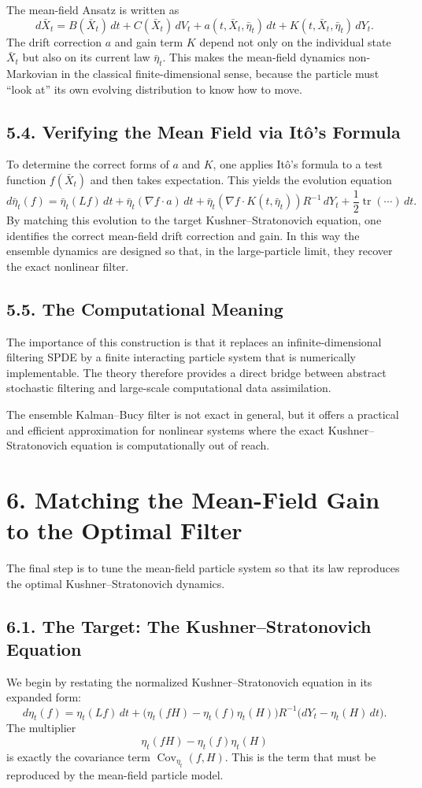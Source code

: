 \documentclass[11pt]{article}
\theoremstyle{definition}
\theoremstyle{remark}
\begin{document}
The mean-field Ansatz is written as
\[
d\bar X_t
=
B(\bar X_t)\,dt
+
C(\bar X_t)\,dV_t
+
a(t,\bar X_t,\bar\eta_t)\,dt
+
K(t,\bar X_t,\bar\eta_t)\,dY_t.
\]
The drift correction \(a\) and gain term \(K\) depend not only on the individual state \(\bar X_t\) but also on its current law \(\bar\eta_t\). This makes the mean-field dynamics non-Markovian in the classical finite-dimensional sense, because the particle must ``look at'' its own evolving distribution to know how to move.

\subsection*{5.4. Verifying the Mean Field via It\^o's Formula}
To determine the correct forms of \(a\) and \(K\), one applies It\^o's formula to a test function \(f(\bar X_t)\) and then takes expectation. This yields the evolution equation
\[
d\bar\eta_t(f)
=
\bar\eta_t(Lf)\,dt
+
\bar\eta_t(\nabla f\cdot a)\,dt
+
\bar\eta_t(\nabla f\cdot K(t,\bar\eta_t))R^{-1}\,dY_t
+
\frac12 \operatorname{tr}(\cdots)\,dt.
\]
By matching this evolution to the target Kushner--Stratonovich equation, one identifies the correct mean-field drift correction and gain. In this way the ensemble dynamics are designed so that, in the large-particle limit, they recover the exact nonlinear filter.

\subsection*{5.5. The Computational Meaning}
The importance of this construction is that it replaces an infinite-dimensional filtering SPDE by a finite interacting particle system that is numerically implementable. The theory therefore provides a direct bridge between abstract stochastic filtering and large-scale computational data assimilation.

The ensemble Kalman--Bucy filter is not exact in general, but it offers a practical and efficient approximation for nonlinear systems where the exact Kushner--Stratonovich equation is computationally out of reach.

\section*{6. Matching the Mean-Field Gain to the Optimal Filter}
The final step is to tune the mean-field particle system so that its law reproduces the optimal Kushner--Stratonovich dynamics.

\subsection*{6.1. The Target: The Kushner--Stratonovich Equation}
We begin by restating the normalized Kushner--Stratonovich equation in its expanded form:
\[
d\eta_t(f)
=
\eta_t(Lf)\,dt
+
\bigl(\eta_t(fH)-\eta_t(f)\eta_t(H)\bigr)R^{-1}
\bigl(dY_t-\eta_t(H)\,dt\bigr).
\]
The multiplier
\[
\eta_t(fH)-\eta_t(f)\eta_t(H)
\]
is exactly the covariance term \(\operatorname{Cov}_{\eta_t}(f,H)\). This is the term that must be reproduced by the mean-field particle model.
\end{document}
